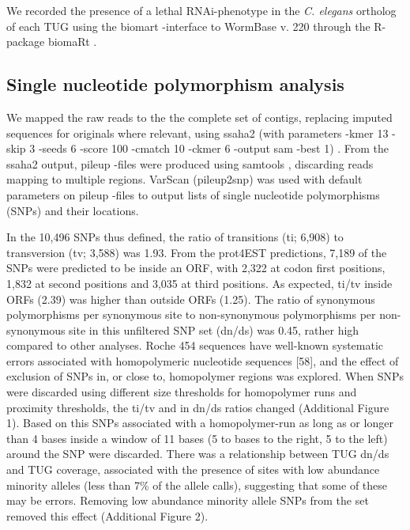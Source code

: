 \documentclass[10pt]{bmc_article}
\newenvironment{bmcformat}{\begin{raggedright}\baselineskip20pt\sloppy\setboolean{publ}{false}}{\end{raggedright}\baselineskip20pt\sloppy}
\begin{document}
\begin{bmcformat}
We recorded the presence of a lethal RNAi-phenotype in the
\textit{C. elegans} ortholog of each TUG using the biomart -interface
\cite{pmid22083790} to WormBase v. 220 through the R-package biomaRt
\cite{pmid19617889}.

\subsection*{Single nucleotide polymorphism analysis}

We mapped the raw reads to the the complete set of contigs, replacing
imputed sequences for originals where relevant, using ssaha2 (with
parameters -kmer 13 -skip 3 -seeds 6 -score 100 -cmatch 10 -ckmer 6
-output sam -best 1) \cite{pmid11591649}. From the ssaha2 output,
pileup -files were produced using samtools
\cite{journals/bioinformatics/LiHWFRHMAD09}, discarding reads mapping
to multiple regions. VarScan \cite{pmid19542151} (pileup2snp) was used
with default parameters on pileup -files to output lists of single
nucleotide polymorphisms (SNPs) and their locations.


In the 10,496 SNPs thus defined, the ratio of transitions (ti; 6,908)
to transversion (tv; 3,588) was 1.93. From the prot4EST predictions,
7,189 of the SNPs were predicted to be inside an ORF, with 2,322 at
codon first positions, 1,832 at second positions and 3,035 at third
positions. As expected, ti/tv inside ORFs (2.39) was higher than
outside ORFs (1.25). The ratio of synonymous polymorphisms per
synonymous site to non-synonymous polymorphisms per non-synonymous
site in this unfiltered SNP set (dn/ds) was 0.45, rather high compared
to other analyses. Roche 454 sequences have well-known systematic
errors associated with homopolymeric nucleotide sequences [58], and
the effect of exclusion of SNPs in, or close to, homopolymer regions
was explored. When SNPs were discarded using different size thresholds
for homopolymer runs and proximity thresholds, the ti/tv and in dn/ds
ratios changed (Additional Figure 1). Based on this SNPs associated
with a homopolymer-run as long as or longer than 4 bases inside a
window of 11 bases (5 to bases to the right, 5 to the left) around the
SNP were discarded. There was a relationship between TUG dn/ds and TUG
coverage, associated with the presence of sites with low abundance
minority alleles (less than 7\% of the allele calls), suggesting that
some of these may be errors. Removing low abundance minority allele
SNPs from the set removed this effect (Additional Figure 2).


\end{bmcformat}
\end{document}

